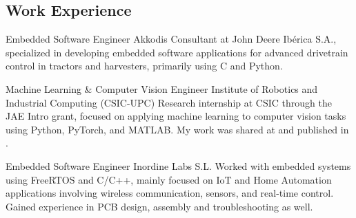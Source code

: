 \documentclass[10pt]{article} %
\newcommand{\MYhref}[3][brown]{\href{#2}{\color{#1}{#3} \footnotesize\faExternalLink}}%
\begin{document}
\begin{paracol}{2}
\section{Work Experience}





{} %
{Embedded Software Engineer} %
{Akkodis} %
{Consultant at John Deere Ibérica S.A., specialized in developing embedded software applications for advanced drivetrain control in tractors and harvesters, primarily using C and Python.} %


{} %
{Machine Learning \& Computer Vision Engineer} %
{Institute of Robotics and Industrial Computing (CSIC-UPC)} %
{Research internship at CSIC through the JAE Intro grant, focused on applying machine learning to computer vision tasks using Python, PyTorch, and MATLAB. My work was shared at \MYhref{https://2024.ieeeicip.org/}{ICIP2024} and published in \MYhref{https://doi.org/10.1109/ICIP51287.2024.10647967}{IEEE \textit{Xplore}\textsuperscript{\textcopyright}}.} %


{} %
{Embedded Software Engineer} %
{Inordine Labs S.L.} %
{Worked with embedded systems using FreeRTOS and C/C++, mainly focused on IoT and Home Automation applications involving wireless communication, sensors, and real-time control. Gained experience in PCB design, assembly and troubleshooting as well.} %






\end{paracol}
\end{document}
